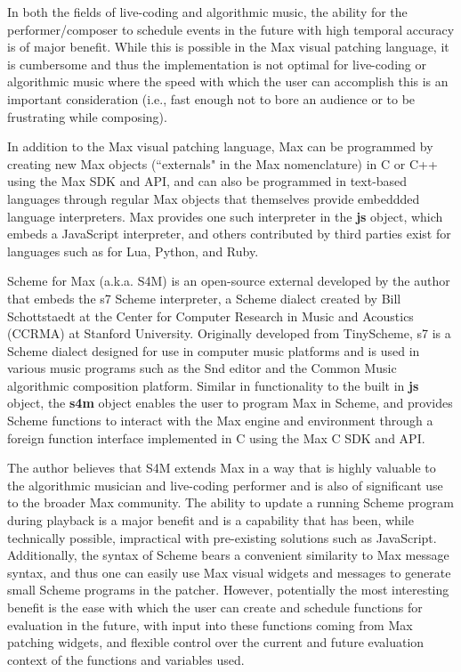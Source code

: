 \documentclass[acmsmall]{acmart}
\begin{document}
In both the fields of live-coding and algorithmic music, the ability for
the performer/composer to schedule events in the future with high temporal
accuracy is of major benefit. While this is possible in the Max visual
patching language, it is cumbersome and thus the implementation is not
optimal for live-coding or algorithmic music where the speed with which
the user can accomplish this is an important consideration (i.e., fast
enough not to bore an audience or to be frustrating while composing).

In addition to the Max visual patching language, Max can be programmed
by creating new Max objects (``externals" in the Max nomenclature) in C or C++ 
using the Max SDK and API, and can also be programmed in text-based 
languages through regular Max objects that themselves provide embeddded language
interpreters. Max provides one such interpreter in the \textbf{js} object, 
which embeds a JavaScript interpreter, and others contributed by third parties
exist for languages such as for Lua, Python, and Ruby. 

Scheme for Max (a.k.a. S4M) is an open-source external developed by the 
author that embeds the s7 Scheme interpreter, a Scheme dialect created by
Bill Schottstaedt at the  Center for Computer Research in Music and Acoustics
(CCRMA) at Stanford University. Originally developed
from TinyScheme, s7 is a Scheme dialect designed for use in computer music
platforms and is used in various music programs such as the Snd editor and the
Common Music algorithmic composition platform. 
\cite{Schottstaedt2021} 
Similar in functionality to the built
in \textbf{js} object, the \textbf{s4m} object enables the user to program Max in Scheme,
and provides Scheme functions to interact with the Max engine and environment through
a foreign function interface implemented in C using the Max C SDK and API.

The author believes that S4M extends Max in a way that is highly valuable to 
the algorithmic musician and live-coding performer and is also of significant 
use to the broader Max community. The ability to update
a running Scheme program during playback is a major benefit
and is a capability that has been, while technically possible, impractical
with pre-existing solutions such as JavaScript. Additionally, the syntax
of Scheme bears a convenient similarity to Max message syntax, and thus 
one can easily use Max visual widgets and messages to generate small Scheme programs in the
patcher. However, potentially the most interesting benefit is the ease with which the user 
can create and schedule functions for evaluation in the future, with 
input into these functions coming from Max patching widgets, and flexible control
over the current and future evaluation context of the functions and variables used.
\end{document}
